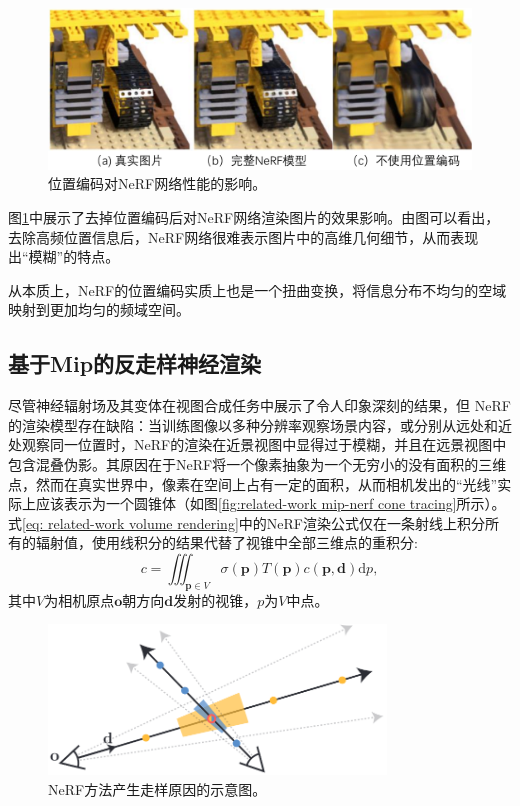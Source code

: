 \begin{figure}[ht]
    \centering
    \includegraphics[width=\textwidth]{undergraduate-thesis/images/related-work/NeRF ablation-PE.pdf}
    \caption{位置编码对NeRF网络性能的影响\cite{mildenhall_nerf_2020}。}
    \label{fig:related-work nerf-PE-ablation}
\end{figure}

图\ref{fig:related-work nerf-PE-ablation}中展示了去掉位置编码后对NeRF网络渲染图片的效果影响。由图可以看出，去除高频位置信息后，NeRF网络很难表示图片中的高维几何细节，从而表现出“模糊”的特点。

从本质上，NeRF的位置编码实质上也是一个扭曲变换，将信息分布不均匀的空域映射到更加均匀的频域空间。

\subsection{基于Mip的反走样神经渲染}
尽管神经辐射场\cite{mildenhall_nerf_2020}及其变体\cite{muller_instant_2022,martin-brualla_nerf_2021,zhang_nerf_2020}在视图合成任务中展示了令人印象深刻的结果，但 NeRF 的渲染模型存在缺陷：当训练图像以多种分辨率观察场景内容，或分别从远处和近处观察同一位置时，NeRF的渲染在近景视图中显得过于模糊，并且在远景视图中包含混叠伪影。其原因在于NeRF将一个像素抽象为一个无穷小的没有面积的三维点，然而在真实世界中，像素在空间上占有一定的面积，从而相机发出的“光线”实际上应该表示为一个圆锥体（如图\ref{fig:related-work mip-nerf cone tracing}所示）。式\ref{eq: related-work volume rendering}中的NeRF渲染公式仅在一条射线上积分所有的辐射值，使用线积分的结果代替了视锥中全部三维点的重积分:
\begin{equation}
    c = \iiint_{\mathbf{p}\in V}\sigma(\mathbf{p})T(\mathbf{p})c(\mathbf{p},\mathbf{d})\text{d}p,
\end{equation}
其中$V$为相机原点$\mathbf{o}$朝方向$\mathbf{d}$发射的视锥，$p$为$V$中点。

\begin{figure}[h]
    \centering
    \includegraphics[width=0.8\textwidth]{undergraduate-thesis/images/related-work/mipnerf-intersection.png}
    \caption{NeRF方法产生走样原因的示意图\cite{barron_mip-nerf_2021}。}
    \label{fig:related-work mip-nerf intersection}
\end{figure}

